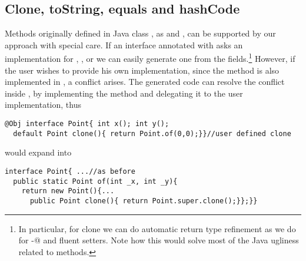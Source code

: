 \begin{comment}
\subsection{Class Invariants in ClassLess Java}
Since objects are created by automatically generated methods, another limitation
of our current approach is that there is no place where the user can dynamically
check for class invariants. In Java often we see code like
\begin{lstlisting}
class Point{ int x; int y;
  Point(int x; int y){this.x=x;this.y=y; assert this.checkInvariant();}
  private boolean checkInvariant(){... x>0,y>0...}
}
\end{lstlisting} 

We are considering an extension of our annotation where 
default methods with the special name \Q@checkInvariant()@ will be called inside the \Q@of@ methods.
If multiple interfaces are implemented, and more then one offers
\Q@checkInvariant()@,  a composed implementation could be automatically generated, composing by \Q@&&@ the various competing implementations.
\end{comment}

\subsection{Clone, toString, equals and hashCode}

Methods originally defined in Java class \Q@Object@, as \Q@clone@ and
\Q@toString@, can be supported by our approach with special care. If an
interface annotated with \mixin asks an implementation for \Q@clone@,
\Q@toString@, \Q@equals@ or \Q@hashCode@ we can easily generate one from the
fields.\footnote{In particular, for clone we can do automatic return type
  refinement as we do for \Q@with-@ and fluent setters. Note how this would
  solve most of the Java ugliness related to \Q@clone@ methods.}  However, if
the user wishes to provide his own implementation, since the method is also
implemented in \Q@Object@, a conflict arises. The generated code can resolve the
conflict inside \Q@of@, by implementing the method and delegating it to the user
implementation, thus

\begin{lstlisting}
@Obj interface Point{ int x(); int y();
  default Point clone(){ return Point.of(0,0);}}//user defined clone
\end{lstlisting} 
would expand into 

\begin{lstlisting}
interface Point{ ...//as before
  public static Point of(int _x, int _y){
    return new Point(){...
      public Point clone(){ return Point.super.clone();}};}}
\end{lstlisting} 
